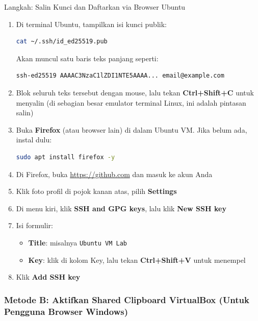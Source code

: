 \documentclass[
    a4paper,
    11pt,
    parskip=half
]{scrartcl}
\begin{document}
\begin{stepbox}{Langkah: Salin Kunci dan Daftarkan via Browser Ubuntu}
\begin{enumerate}
    \item Di terminal Ubuntu, tampilkan isi kunci publik:
\begin{lstlisting}[language=bash]
cat ~/.ssh/id_ed25519.pub
\end{lstlisting}
    Akan muncul satu baris teks panjang seperti:
\begin{lstlisting}
ssh-ed25519 AAAAC3NzaC1lZDI1NTE5AAAA... email@example.com
\end{lstlisting}

    \item Blok seluruh teks tersebut dengan mouse, lalu tekan \textbf{Ctrl+Shift+C} untuk menyalin (di sebagian besar emulator terminal Linux, ini adalah pintasan salin)

    \item Buka \textbf{Firefox} (atau browser lain) di dalam Ubuntu VM. Jika belum ada, instal dulu:
\begin{lstlisting}[language=bash]
sudo apt install firefox -y
\end{lstlisting}

    \item Di Firefox, buka \url{https://github.com} dan masuk ke akun Anda

    \item Klik foto profil di pojok kanan atas, pilih \textbf{Settings}

    \item Di menu kiri, klik \textbf{SSH and GPG keys}, lalu klik \textbf{New SSH key}

    \item Isi formulir:
        \begin{itemize}
            \item \textbf{Title}: misalnya \texttt{Ubuntu VM Lab}
            \item \textbf{Key}: klik di kolom Key, lalu tekan \textbf{Ctrl+Shift+V} untuk menempel
        \end{itemize}

    \item Klik \textbf{Add SSH key}
\end{enumerate}
\end{stepbox}

\subsubsection*{Metode B: Aktifkan Shared Clipboard VirtualBox (Untuk Pengguna Browser Windows)}
\end{document}
